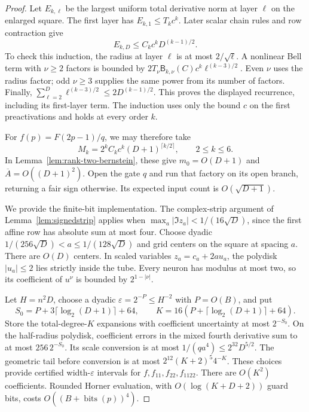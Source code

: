 \begin{proof}
Let $E_{k,\ell}$ be the largest uniform total derivative norm at
layer $\ell$ on the enlarged square. The first layer has
$E_{k,1}\le T_kc^k$. Later scalar chain rules and row contraction
give
\[
 E_{k,D}\le C_kc^kD^{(k-1)/2}.
\]
To check this induction, the radius at layer $\ell$ is at most
$2/\sqrt\ell$. A nonlinear Bell term with $\nu\ge2$ factors
is bounded by
$2T_\nu\mathsf B_{k,\nu}(C)c^k\ell^{(k-3)/2}$.
Even $\nu$ uses the radius factor; odd $\nu\ge3$ supplies the
same power from its number of factors. Finally,
$\sum_{\ell=2}^D\ell^{(k-3)/2}\le2D^{(k-1)/2}$.
This proves the displayed recurrence, including its first-layer term.
The induction uses only the bound $c$ on the first preactivations and
holds at every order $k$.

For $f(p)=F(2p-1)/q$, we may therefore take
\[
 M_k=2^kC_kc^k(D+1)^{\lceil k/2\rceil},\qquad 2\le k\le6.
\]
In Lemma~\ref{lem:rank-two-bernstein}, these give
$m_0=O(D+1)$ and $\overline A=O((D+1)^2)$. Open the gate $q$
and run that factory on its open branch, returning a fair sign
otherwise. Its expected input count is $O(\sqrt{D+1})$.

We provide the finite-bit implementation. The complex-strip argument
of Lemma~\ref{lem:signedstrip} applies when
$\max_a|\Im z_a|<1/(16\sqrt D)$, since the first affine row has
absolute sum at most four. Choose dyadic
$1/(256\sqrt D)<a\le1/(128\sqrt D)$ and grid centers on the
square at spacing $a$. There are $O(D)$ centers. In scaled variables
$z_a=c_a+2au_a$, the polydisk $|u_a|\le2$ lies strictly inside
the tube. Every neuron has modulus at most two, so its coefficient
of $u^\nu$ is bounded by $2^{1-|\nu|}$.

Let $H=n^2D$, choose a dyadic $\varepsilon=2^{-P}\le H^{-2}$
with $P=O(B)$, and put
\[
 S_0=P+3\lceil\log_2(D+1)\rceil+64,\qquad
 K=16(P+\lceil\log_2(D+1)\rceil+64).
\]
Store the total-degree-$K$ expansions with coefficient uncertainty
at most $2^{-S_0}$. On the half-radius polydisk, coefficient errors
in the mixed fourth derivative sum to at most $256\,2^{-S_0}$.
Its scale conversion is at most
$1/(qa^4)\le2^{32}D^{5/2}$. The geometric tail before conversion
is at most $2^{12}(K+2)^5 4^{-K}$. These choices provide certified
width-$\varepsilon$ intervals for $f,f_{11},f_{22},f_{1122}$.
There are $O(K^2)$ coefficients. Rounded Horner evaluation, with
$O(\log(K+D+2))$ guard bits, costs
$O((B+\operatorname{bits}(p))^4)$.


\end{proof}
